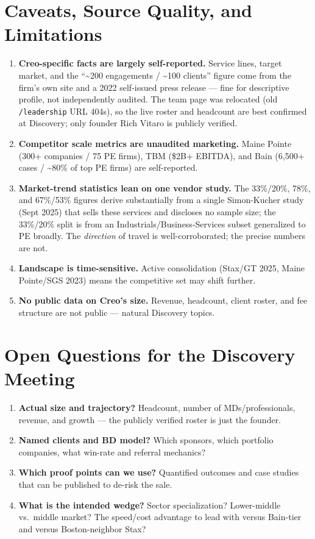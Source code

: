 \documentclass[11pt]{article}
\begin{document}
\section{Caveats, Source Quality, and Limitations}
\begin{enumerate}
  \item \textbf{Creo-specific facts are largely self-reported.} Service lines,
  target market, and the ``\textasciitilde{}200 engagements / \textasciitilde{}100
  clients'' figure come from the firm's own site and a 2022 self-issued press
  release --- fine for descriptive profile, not independently audited. The team
  page was relocated (old \texttt{/leadership} URL 404s), so the live roster and
  headcount are best confirmed at Discovery; only founder Rich Vitaro is publicly
  verified.
  \item \textbf{Competitor scale metrics are unaudited marketing.} Maine Pointe
  (300+ companies / 75 PE firms), TBM (\$2B+ EBITDA), and Bain
  (6,500+ cases / \textasciitilde{}80\% of top PE firms) are self-reported.
  \item \textbf{Market-trend statistics lean on one vendor study.} The 33\%/20\%,
  78\%, and 67\%/53\% figures derive substantially from a single Simon-Kucher
  study (Sept 2025) that sells these services and discloses no sample size; the
  33\%/20\% split is from an Industrials/Business-Services subset generalized to
  PE broadly. The \emph{direction} of travel is well-corroborated; the precise
  numbers are not.
  \item \textbf{Landscape is time-sensitive.} Active consolidation
  (Stax/GT 2025, Maine Pointe/SGS 2023) means the competitive set may shift
  further.
  \item \textbf{No public data on Creo's size.} Revenue, headcount, client
  roster, and fee structure are not public --- natural Discovery topics.
\end{enumerate}

\section{Open Questions for the Discovery Meeting}
\begin{enumerate}
  \item \textbf{Actual size and trajectory?} Headcount, number of MDs/professionals,
  revenue, and growth --- the publicly verified roster is just the founder.
  \item \textbf{Named clients and BD model?} Which sponsors, which portfolio
  companies, what win-rate and referral mechanics?
  \item \textbf{Which proof points can we use?} Quantified outcomes and case
  studies that can be published to de-risk the sale.
  \item \textbf{What is the intended wedge?} Sector specialization? Lower-middle
  vs.\ middle market? The speed/cost advantage to lead with versus Bain-tier and
  versus Boston-neighbor Stax?
\end{enumerate}
\end{document}
